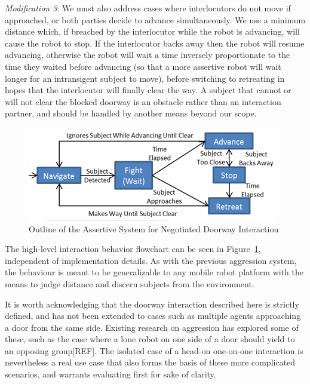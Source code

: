 \documentclass[letterpaper, 10 pt, conference]{ieeeconf}  %
\begin{document}
\textit{Modification 3}: We must also address cases where interlocutors do not move if approached, or both parties decide to advance simultaneously. We use a minimum distance which, if breached by the interlocutor while the robot is advancing, will cause the robot to stop. If the interlocutor backs away then the robot will resume advancing, otherwise the robot will wait a time inversely proportionate to the time they waited before advancing (so that a more assertive robot will wait longer for an intransigent subject to move), before switching to retreating in hopes that the interlocutor will finally clear the way. A subject that cannot or will not clear the blocked doorway is an obstacle rather than an interaction partner, and should be handled by another means beyond our scope. 
 
    \begin{figure}
      \centering
      \includegraphics{assertive_behavior.png}
      \caption{Outline of the Assertive System for Negotiated Doorway Interaction}
      \label{fig:Assertive}
   \end{figure}


The high-level interaction behavior flowchart can be seen in Figure~\ref{fig:Assertive}, independent of implementation details. As with the previous aggression system, the behaviour is meant to be generalizable to any mobile robot platform with the means to judge distance and discern subjects from the environment. 


It is worth acknowledging that the doorway interaction described here is strictly defined, and has not been extended to cases such as multiple agents approaching a door from the same side. Existing research on aggression has explored some of these, such as the case where a lone robot on one side of a door should yield to an opposing group[REF]. The isolated case of a head-on one-on-one interaction is nevertheless a real use case that also forms the basis of these more complicated scenarios, and warrants evaluating first for sake of clarity.
\end{document}
